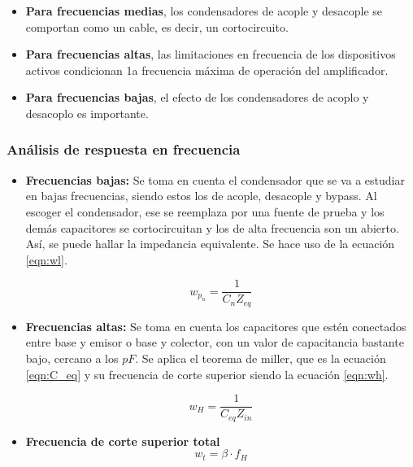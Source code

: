 \begin{itemize}
    \item \textbf{Para frecuencias medias}, los condensadores de acople y desacople se comportan como un cable, es decir, un cortocircuito.
    \item \textbf{Para frecuencias altas}, las limitaciones en frecuencia de los dispositivos activos condicionan 1a frecuencia máxima de operación del amplificador.
    \item \textbf{Para frecuencias bajas}, el efecto de los condensadores de acoplo y desacoplo es importante.
\end{itemize}

\subsubsection{Análisis de respuesta en frecuencia}

\begin{itemize}
    \item \textbf{Frecuencias bajas:} Se toma en cuenta el condensador que se va a estudiar en bajas frecuencias, siendo estos los de acople, desacople y bypass. Al escoger el condensador, ese se reemplaza por una fuente de prueba y los demás capacitores se cortocircuitan y los de alta frecuencia son un abierto. Así, se puede hallar la impedancia equivalente. Se hace uso de la ecuación \ref{eqn:wl}.

          \begin{equation}
              w_{p_n}=\dfrac{1}{C_nZ_{eq}}
              \label{eqn:wl}
          \end{equation}

    \item \textbf{Frecuencias altas:} Se toma en cuenta los capacitores que estén conectados entre base y emisor o base y colector, con un valor de capacitancia bastante bajo, cercano a los $\si{pF}$. Se aplica el teorema de miller, que es la ecuación \ref{eqn:C_eq} y su frecuencia de corte superior siendo la ecuación \ref{eqn:wh}.

          \begin{equation}
              w_{H}=\dfrac{1}{C_{eq}Z_{in}}
              \label{eqn:wh}
          \end{equation}

    \item \textbf{Frecuencia de corte superior total}
          \begin{equation}
              w_t=\beta \cdot f_H
              \label{eqn:wt}
          \end{equation}
\end{itemize}



